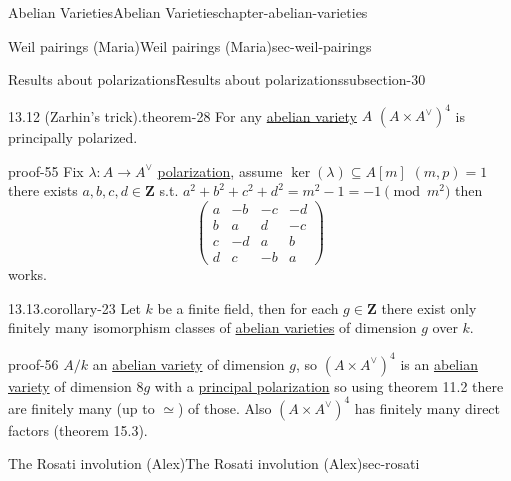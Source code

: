 \documentclass[oneside,10pt,]{book}
\numberwithin{equation}{section}
\newcommand{\lb}{[}
\newcommand{\rb}{]}
\newcommand{\ZZ}{\mathbf{Z}}
\newcommand{\amp}{&}
\begin{document}
\begin{chapterptx}{Abelian Varieties}{}{Abelian Varieties}{}{}{chapter-abelian-varieties}
\begin{sectionptx}{Weil pairings (Maria)}{}{Weil pairings (Maria)}{}{}{sec-weil-pairings}
\begin{subsectionptx}{Results about polarizations}{}{Results about polarizations}{}{}{subsection-30}
\begin{theorem}{13.12 (Zarhin's trick).}{}{theorem-28}
For any \hyperref[def-buntes-abvar]{abelian variety} \(A\) \((A\times A^\vee)^4\) is principally polarized.%
\end{theorem}
\begin{proofptx}{}{proof-55}
\hypertarget{p-328}{}%
Fix \(\lambda \colon A\to A^\vee\) \hyperref[def-c-pol]{polarization}, assume \(\ker (\lambda) \subseteq A\lb m \rb\) \((m, p) = 1\) there exists \(a,b,c,d \in \ZZ\) s.t. \(a^2 + b^2 + c^2 + d^2 = m^2  - 1 = -1 \pmod {m^2}\) then%
\begin{equation*}
\begin{pmatrix} a\amp -b \amp-c\amp -d \\ b\amp a \amp d \amp -c \\ c\amp -d \amp a \amp b \\ d \amp c \amp -b \amp a\end{pmatrix}
\end{equation*}
works.%
\end{proofptx}
\begin{corollary}{13.13.}{}{corollary-23}%
\hypertarget{p-329}{}%
Let \(k\) be a finite field, then for each \(g \in \ZZ\) there exist only finitely many isomorphism classes of \hyperref[def-buntes-abvar]{abelian varieties} of dimension \(g\) over \(k\).%
\end{corollary}
\begin{proofptx}{}{proof-56}
\hypertarget{p-330}{}%
\(A/k\) an \hyperref[def-buntes-abvar]{abelian variety} of dimension \(g\), so \((A\times A^\vee)^4\) is an \hyperref[def-buntes-abvar]{abelian variety} of dimension \(8g\) with a \hyperref[def-polarization]{principal polarization} so using theorem 11.2 there are finitely many (up to \(\simeq\)) of those. Also \((A\times A^\vee)^4\) has finitely many direct factors (theorem 15.3).%
\end{proofptx}
\end{subsectionptx}
\end{sectionptx}
%
%
\typeout{************************************************}
\typeout{************************************************}
%
\begin{sectionptx}{The Rosati involution (Alex)}{}{The Rosati involution (Alex)}{}{}{sec-rosati}
\hypertarget{p-331}{}%

\end{sectionptx}
\end{chapterptx}
\end{document}
